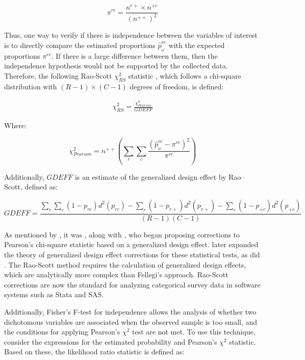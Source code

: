 \documentclass[
  12pt,
]{book}
\begin{document}
\[
\pi^{rc} = \frac{n^{r+} \times n^{+c}}{(n^{++})^2}
\]

Thus, one way to verify if there is independence between the variables of interest is to directly compare the estimated proportions \(\hat{p}^{rc}_{\omega}\) with the expected proportions \(\pi^{rc}\). If there is a large difference between them, then the independence hypothesis would not be supported by the collected data. Therefore, the following Rao-Scott \(\chi^{2}_{RS}\) statistic \citep{rao1984adjusted}, which follows a chi-square distribution with \((R-1) \times (C-1)\) degrees of freedom, is defined:

\begin{eqnarray}
\chi^{2}_{RS}  =  \frac{\chi^{2}_{Pearson}}{GDEFF}
\end{eqnarray}

Where:

\[
\chi^{2}_{Pearson} = n^{++} \left( \sum_r \sum_c \frac{(\hat{p}^{rc}_{\omega} - \pi^{rc})^2}{\pi^{rc}} \right)
\]

Additionally, \(GDEFF\) is an estimate of the generalized design effect by Rao--Scott, defined as:

\[
GDEFF = \frac{\sum_{r}\sum_{c}\left(1-p_{rc}\right)d^{2}\left(p_{rc}\right)-\sum_{r}\left(1-p_{r+}\right)d^{2}\left(p_{r+}\right)-\sum_{c}\left(1-p_{+c}\right)d^{2}\left(p_{+c}\right)}{\left(R-1\right)\left(C-1\right)}
\]

As mentioned by \citet{Heeringa_West_Berglund_2017}, it was \citet{fay1979adjusting}, along with \citet{fellegi1980approximate}, who began proposing corrections to Pearson's chi-square statistic based on a generalized design effect. \citet{rao1984chi_squared} later expanded the theory of generalized design effect corrections for these statistical tests, as did \citet{thomas1987small_sample}. The Rao-Scott method requires the calculation of generalized design effects, which are analytically more complex than Fellegi's approach. Rao-Scott corrections are now the standard for analyzing categorical survey data in software systems such as Stata and SAS.

Additionally, Fisher's F-test for independence allows the analysis of whether two dichotomous variables are associated when the observed sample is too small, and the conditions for applying Pearson's \(\chi^{2}\) test are not met. To use this technique, consider the expressions for the estimated probability and Pearson's \(\chi^{2}\) statistic. Based on these, the likelihood ratio statistic is defined as:
\end{document}
